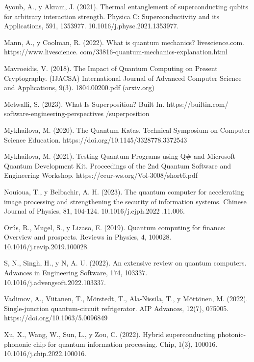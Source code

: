 \documentclass{article}
\begin{document}
Ayoub, A., y Akram, J. (2021). Thermal entanglement of superconducting qubits for arbitrary interaction strength. Physica C: Superconductivity and its Applications, 591, 1353977. 10.1016/j.physc.2021.1353977.

Mann, A., y Coolman, R. (2022). What is quantum mechanics? livescience.com. 
https://www.livescience.
com/33816-quantum-mechanics-explanation.html

Mavroeidis, V. (2018). The Impact of Quantum Computing on Present Cryptography. (IJACSA) International Journal of Advanced Computer Science and Applications, 9(3). 
1804.00200.pdf (arxiv.org)

Metwalli, S. (2023). What Is Superposition? Built In. 
https://builtin.com/
software-engineering-perspectives
/superposition

Mykhailova, M. (2020). The Quantum Katas. Technical Symposium on Computer Science Education. https://doi.org/10.1145/3328778.3372543

Mykhailova, M. (2021). Testing Quantum Programs using Q# and Microsoft Quantum Development Kit. Proceedings of the 2nd Quantum Software and Engineering Workshop. https://ceur-ws.org/Vol-3008/short6.pdf 

Nouioua, T., y Belbachir, A. H. (2023). The quantum computer for accelerating image processing and strengthening the security of information systems. Chinese Journal of Physics, 81, 104-124. 10.1016/j.cjph.2022
.11.006. 

Orús, R., Mugel, S., y Lizaso, E. (2019). Quantum computing for finance: Overview and prospects. Reviews in Physics, 4, 100028. 10.1016/j.revip.2019.100028.

S, N., Singh, H., y N, A. U. (2022). An extensive review on quantum computers. Advances in Engineering Software, 174, 103337. 10.1016/j.advengsoft.2022.103337.

Vadimov, A., Viitanen, T., Mörstedt, T., Ala-Nissila, T., y Möttönen, M. (2022). Single-junction quantum-circuit refrigerator. AIP Advances, 12(7), 075005. https://doi.org/10.1063/5.0096849

Xu, X., Wang, W., Sun, L., y Zou, C. (2022). Hybrid superconducting photonic-phononic chip for quantum information processing. Chip, 1(3), 100016. 10.1016/j.chip.2022.100016.
\end{document}
